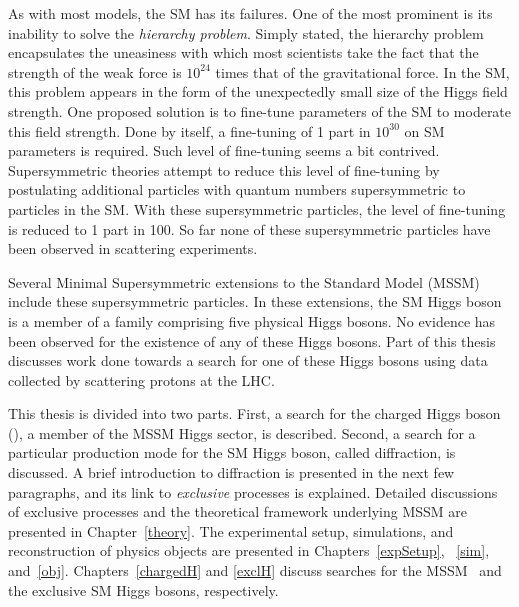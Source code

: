 \par As with most models, the SM has its failures. One of the most prominent  
is its inability to solve the {\it hierarchy problem}. 
Simply stated, the hierarchy problem encapsulates the uneasiness with which most 
scientists take the fact that the strength of the weak force is 
$10^{24}$ times that of the gravitational force. 
%
In the SM, this problem appears in the form of the unexpectedly small size of the Higgs field strength.
One proposed solution is to fine-tune parameters of the SM to moderate this field strength. 
Done by itself, a fine-tuning of 1 part in $10^{30}$ on SM parameters is required. 
Such level of fine-tuning seems a bit contrived. 
Supersymmetric theories attempt to reduce this level of fine-tuning by postulating additional particles with quantum 
numbers supersymmetric to particles in the SM. With these supersymmetric particles, 
the level of fine-tuning is reduced to 1 part in 100. So far none of these supersymmetric particles have 
been observed in scattering experiments.  

\par Several Minimal Supersymmetric extensions to the Standard Model (MSSM) include 
these supersymmetric particles. In these extensions, the SM Higgs boson is a member of a 
family comprising five physical Higgs bosons. No evidence has been observed for the existence of 
any of these Higgs bosons. Part of this thesis discusses work done towards a search for one of these 
Higgs bosons using data collected by scattering protons at the LHC.  

\par This thesis is divided into two parts. First, a search for the charged Higgs boson (\Hpm), 
a member of the MSSM Higgs sector, is described. Second, a search for a particular 
production mode for the SM Higgs boson, called diffraction, is discussed.  
A brief introduction to diffraction is presented in the next few paragraphs, and its link to 
{\it exclusive} processes is explained. Detailed discussions of exclusive processes and the 
theoretical framework underlying MSSM are presented in Chapter~\ref{theory}. The experimental setup, 
simulations, and reconstruction of physics objects are presented in 
Chapters~\ref{expSetup}, ~\ref{sim}, and~\ref{obj}. Chapters~\ref{chargedH} and 
\ref{exclH} discuss searches for the MSSM \Hpm\ and the exclusive SM Higgs bosons, respectively. 

